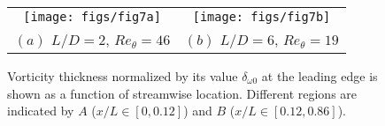 \documentclass{jfm}
\begin{document}
\begin{figure}
\begin{tabular}{cc}
   \texttt{[image: figs/fig7a]}&   \texttt{[image: figs/fig7b]}\\
   $(a)$  $L/D=2$, $Re_\theta = 46$ & $(b)$  $L/D=6$, $Re_\theta = 19$
   \end{tabular}
\caption{Vorticity thickness normalized by its value $\delta_{\omega 0}$ at the leading edge is shown as a function of streamwise location. Different regions are indicated by $A$ ($x/L\in[0,0.12]$) and $B$ ($x/L\in[0.12,0.86]$).}
\label{fig:vtLD} 
\end{figure}

\end{document}
